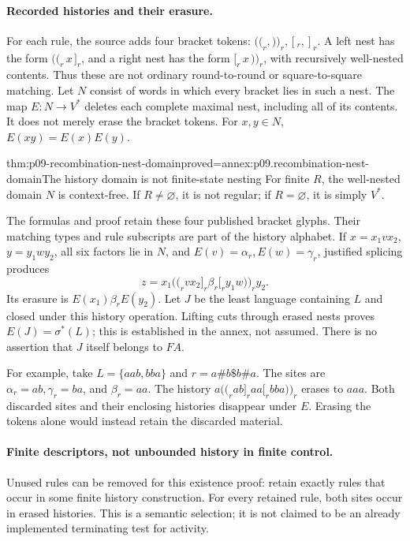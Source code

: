 \paragraph{Recorded histories and their erasure.}
For each rule, the source adds four bracket tokens:
\(\mathopen{(\!(}_r,\mathclose{)\!)}_r,[_r,]_r\).
A left nest has the form
\(\mathopen{(\!(}_r\,x\,]_r\), and a right nest has the form
\([_r\,x\,\mathclose{)\!)}_r\), with recursively well-nested contents.
Thus these are not ordinary round-to-round or square-to-square matching.
Let \(N\) consist of words in which every bracket lies in such a nest.
The map \(E:N\to V^*\) deletes each complete maximal nest, including all
of its contents. It does not merely erase the bracket tokens.
For \(x,y\in N\), \(E(xy)=E(x)E(y)\).

\begin{hblemma}{thm:p09-recombination-nest-domain}{proved=annex:p09.recombination-nest-domain}{The history domain is not finite-state nesting}
For finite \(R\), the well-nested domain \(N\) is context-free.
If \(R\ne\varnothing\), it is not regular; if \(R=\varnothing\),
it is simply \(V^*\).
\end{hblemma}

The formulas and proof retain these four published bracket glyphs.
Their matching types and rule subscripts are part of the history alphabet.
If \(x=x_1vx_2\), \(y=y_1wy_2\), all six factors lie in \(N\), and
\(E(v)=\alpha_r,E(w)=\gamma_r\), justified splicing produces
\[
 z=x_1\mathopen{(\!(}_rvx_2]_r\beta_r[_ry_1w\mathclose{)\!)}_ry_2.
\]
Its erasure is \(E(x_1)\beta_rE(y_2)\).
Let \(J\) be the least language containing \(L\) and closed under this
history operation. Lifting cuts through erased nests proves
\(E(J)=\sigma^*(L)\); this is established in the annex, not assumed.
There is no assertion that \(J\) itself belongs to \(FA\).

For example, take \(L=\{aab,bba\}\) and
\(r=a\#b\$b\#a\). The sites are \(\alpha_r=ab,\gamma_r=ba\),
and \(\beta_r=aa\). The history
\(a\mathopen{(\!(}_rab]_raa[_rbba\mathclose{)\!)}_r\) erases to \(aaa\).
Both discarded sites and their enclosing histories disappear under \(E\).
Erasing the tokens alone would instead retain the discarded material.

\paragraph{Finite descriptors, not unbounded history in finite control.}
Unused rules can be removed for this existence proof: retain exactly rules
that occur in some finite history construction. For every retained rule,
both sites occur in erased histories. This is a semantic selection; it is
not claimed to be an already implemented terminating test for activity.

